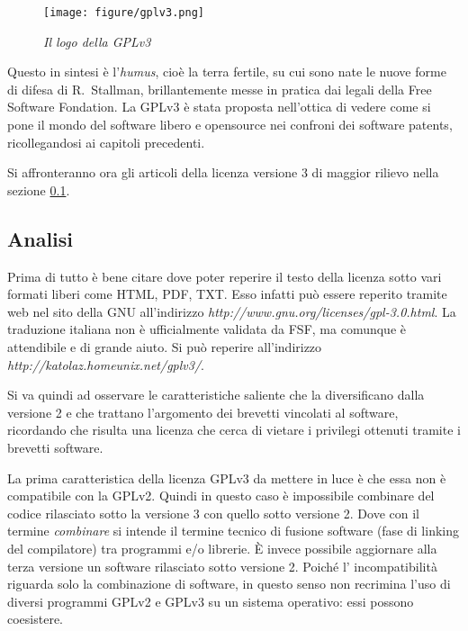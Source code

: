 \begin{figure}[b]
	\begin{center}
		\texttt{[image: figure/gplv3.png]}
	\end{center}
	\caption{\textit{Il logo della GPLv3}}
\end{figure}

Questo in sintesi è l'\textit{humus}, cioè la terra fertile, su cui sono nate le nuove forme di difesa di R.~Stallman, brillantemente messe in pratica dai legali della Free Software Fondation. La GPLv3 è stata proposta nell'ottica di vedere come si pone il mondo del software libero e opensource nei confroni dei software patents, ricollegandosi ai capitoli precedenti.

Si affronteranno ora gli articoli della licenza versione 3 di maggior rilievo nella sezione \ref{sec:analisi-gpl3}.

\subsection{Analisi} \label{sec:analisi-gpl3}
Prima di tutto è bene citare dove poter reperire il testo della licenza sotto vari formati liberi come HTML, PDF, TXT. Esso infatti può essere reperito tramite web nel sito della GNU all'indirizzo \textit{http://www.gnu.org/licenses/gpl-3.0.html}. La traduzione italiana non è ufficialmente validata da FSF, ma comunque è attendibile e di grande aiuto. Si può reperire all'indirizzo \textit{http://katolaz.homeunix.net/gplv3/}.

Si va quindi ad osservare le caratteristiche saliente che la diversificano dalla versione 2 e che trattano l'argomento dei brevetti vincolati al software, ricordando che risulta una licenza che cerca di vietare i privilegi ottenuti tramite i brevetti software.

La prima caratteristica della licenza GPLv3 da mettere in luce è che essa non è compatibile con la GPLv2. Quindi in questo caso è impossibile combinare del codice rilasciato sotto la versione 3 con quello sotto versione 2. Dove con il termine \textit{combinare} si intende il termine tecnico di fusione software (fase di linking del compilatore) tra programmi e/o librerie.  \`E invece possibile aggiornare alla terza versione un software rilasciato sotto versione 2. Poiché l' incompatibilità riguarda solo la combinazione di software, in questo senso non recrimina l'uso di diversi programmi GPLv2 e GPLv3 su un sistema operativo: essi possono coesistere.


